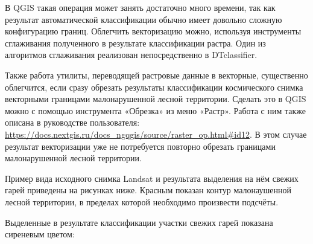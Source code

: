 В QGIS такая операция может занять достаточно много времени, так как результат автоматической классификации обычно имеет довольно сложную конфигурацию границ. Облегчить векторизацию можно, используя инструменты сглаживания полученного в результате классификации растра. Один из алгоритмов сглаживания реализован непосредственно в DTclassifier.

Также работа утилиты, переводящей растровые данные в векторные, существенно облегчится, если сразу обрезать результаты классификации космического снимка векторными границами малонарушенной лесной территории. Сделать это в QGIS можно с помощью инструмента «Обрезка» из меню «Растр». Работа с ним также описана в руководстве пользователя: \url{https://docs.nextgis.ru/docs_ngqgis/source/raster_op.html#id12}. В этом случае результат векторизации уже не потребуется повторно обрезать границами малонарушенной лесной территории.

Пример вида исходного снимка Landsat и результата выделения на нём свежих гарей приведены на рисунках ниже. Красным показан контур малонаушенной лесной территории, в пределах которой необходимо произвести подсчёты.


Выделенные в результате классификации участки свежих гарей показана сиреневым цветом:


